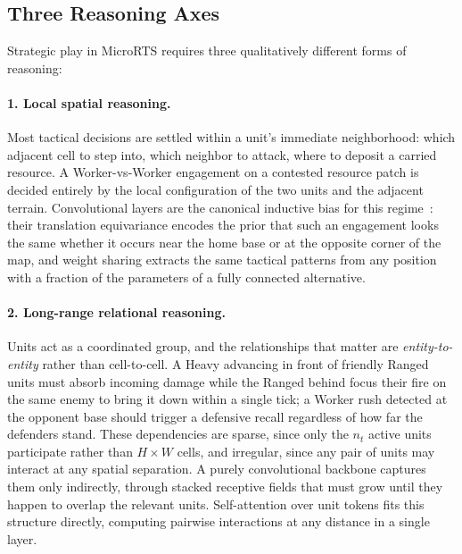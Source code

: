 \subsection{Three Reasoning Axes}
\label{subsec:axes}

Strategic play in MicroRTS requires three qualitatively different forms of reasoning:

\paragraph*{1. Local spatial reasoning.} Most tactical decisions are settled within a unit's immediate neighborhood: which adjacent cell to step into, which neighbor to attack, where to deposit a carried resource. A Worker-vs-Worker engagement on a contested resource patch is decided entirely by the local configuration of the two units and the adjacent terrain. Convolutional layers are the canonical inductive bias for this regime~\cite{stanescuEvaluatingRealtimeStrategy2016}: their translation equivariance encodes the prior that such an engagement looks the same whether it occurs near the home base or at the opposite corner of the map, and weight sharing extracts the same tactical patterns from any position with a fraction of the parameters of a fully connected alternative.

\paragraph*{2. Long-range relational reasoning.} Units act as a coordinated group, and the relationships that matter are \emph{entity-to-entity} rather than cell-to-cell. A Heavy advancing in front of friendly Ranged units must absorb incoming damage while the Ranged behind focus their fire on the same enemy to bring it down within a single tick; a Worker rush detected at the opponent base should trigger a defensive recall regardless of how far the defenders stand. These dependencies are sparse, since only the $n_t$ active units participate rather than $H{\times}W$ cells, and irregular, since any pair of units may interact at any spatial separation. A purely convolutional backbone captures them only indirectly, through stacked receptive fields that must grow until they happen to overlap the relevant units. Self-attention over unit tokens fits this structure directly, computing pairwise interactions at any distance in a single layer.

